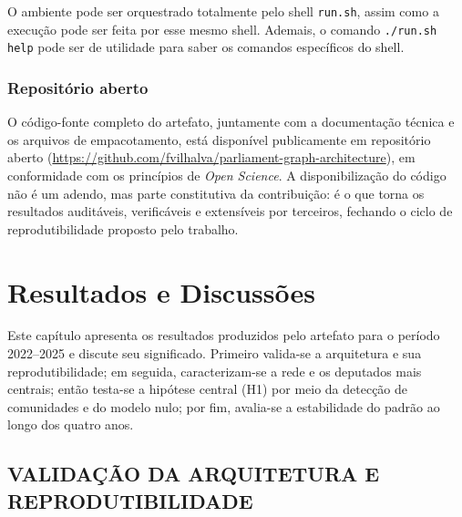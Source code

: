 \documentclass[
      12pt,
      a4paper,
      openright,
      oneside,
      chapter=TITLE,
      section=TITLE,
      english,
      french,
      spanish,
      brazilian
    ]{abntex2}
\begin{document}
    O ambiente pode ser orquestrado totalmente pelo shell \texttt{run.sh}, assim como a execução pode ser feita por esse mesmo shell. Ademais, o comando \texttt{./run.sh help} pode ser de utilidade para saber os comandos específicos do shell.
    
    \subsection{Repositório aberto}

    O código-fonte completo do artefato, juntamente com a documentação técnica e os
    arquivos de empacotamento, está disponível publicamente em repositório aberto
    (\url{https://github.com/fvilhalva/parliament-graph-architecture}), em
    conformidade com os princípios de \textit{Open Science}. A disponibilização do
    código não é um adendo, mas parte constitutiva da contribuição: é o que torna os
    resultados auditáveis, verificáveis e extensíveis por terceiros, fechando o ciclo
    de reprodutibilidade proposto pelo trabalho.

    \chapter{Resultados e Discussões}
    \label{cap:resultados}
    
    
    Este capítulo apresenta os resultados produzidos pelo artefato para o período 2022--2025 e discute seu significado. Primeiro valida-se a arquitetura e sua reprodutibilidade; em seguida, caracterizam-se a rede e os deputados mais centrais; então testa-se a hipótese central (H1) por meio da detecção de comunidades e do modelo nulo; por fim, avalia-se a estabilidade do padrão ao longo dos quatro anos.
    
    \section{VALIDAÇÃO DA ARQUITETURA E REPRODUTIBILIDADE}
    
\end{document}
